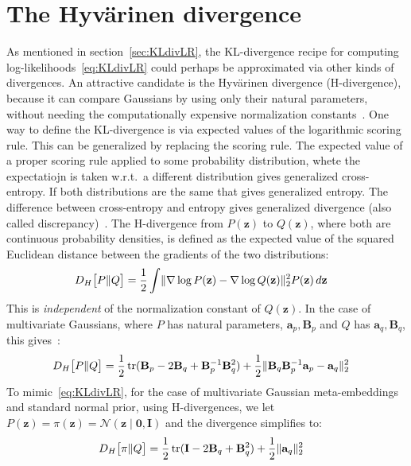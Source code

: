 \documentclass[a4paper,oneside,12pt,english]{report}
\def\zvec{\mathbf{z}}
\def\ND{\mathcal{N}}
\DeclareMathOperator{\trace}{tr}
\def\Hdiv#1#2{D_H\bigl[#1\|#2\bigr]}
\def\Bmat{\mathbf{B}}
\def\Imat{\mathbf{I}}
\def\avec{\mathbf{a}}
\def\nulvec{\boldsymbol{0}}
\begin{document}
\section{The Hyv\"arinen divergence}
\label{sec:Hdiv}
As mentioned in section~\ref{sec:KLdivLR}, the KL-divergence recipe for computing log-likelihoods~\eqref{eq:KLdivLR} could perhaps be approximated via other kinds of divergences. An attractive candidate is the Hyv\"arinen divergence (H-divergence), because it can compare Gaussians by using only their natural parameters, without needing the computationally expensive normalization constants~\cite{score_matching,Dawid_Musio_PSR_ModelSelec_2015}. One way to define the KL-divergence is via expected values of the logarithmic scoring rule. This can be generalized by replacing the scoring rule. The expected value of a proper scoring rule applied to some probability distribution, whete the expectatiojn is taken w.r.t.\ a different distribution gives generalized cross-entropy. If both distributions are the same that gives generalized entropy. The difference between cross-entropy and entropy gives generalized divergence (also called discrepancy)~\cite{Dawid_Musio_ThApp_PSR_2014}. The H-divergence from $P(\zvec)$ to $Q(\zvec)$, where both are continuous probability densities, is defined as the expected value of the squared Euclidean distance between the gradients of the two distributions:
\begin{align}
\Hdiv{P}{Q} &= \frac12\int \norm{\nabla\log P(\zvec)-\nabla\log Q(\zvec)}^2 P(\zvec)\,d\zvec
\end{align}
This is \emph{independent} of the normalization constant of $Q(\zvec)$. In the case of multivariate Gaussians, where $P$ has natural parameters, $\avec_p,\Bmat_p$ and $Q$ has $\avec_q,\Bmat_q$, this gives~\cite{Dawid_Musio_PSR_ModelSelec_2015}:
\begin{align}
\Hdiv{P}{Q} &= \frac12\trace(\Bmat_p-2\Bmat_q+\Bmat_p^{-1}\Bmat_q^2) + \frac12\norm{\Bmat_q\Bmat_p^{-1}\avec_p-\avec_q}^2
\end{align}
To mimic~\eqref{eq:KLdivLR}, for the case of multivariate Gaussian meta-embeddings and standard normal prior, using H-divergences, we let $P(\zvec)=\pi(\zvec)=\ND(\zvec\mid\nulvec,\Imat)$ and the divergence simplifies to: 
\begin{align}
\Hdiv{\pi}{Q} &= \frac12\trace(\Imat-2\Bmat_q+\Bmat_q^2) + \frac12\norm{\avec_q}^2
\end{align}
\end{document}
